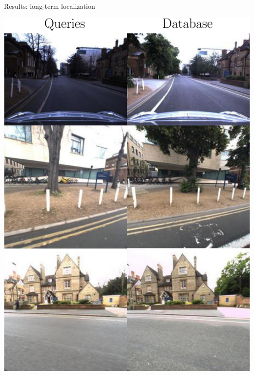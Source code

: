 \begin{frame}{Results: long-term localization}
	\begin{minipage}{0.27\linewidth}
			\includegraphics[width=\linewidth]{vect/res/dataset/lt_ex}
			\vfill


\end{minipage}
\end{frame}
